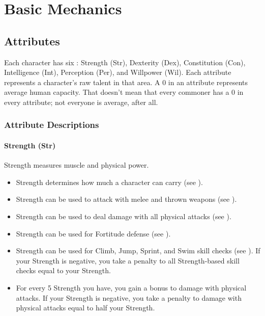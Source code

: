 \chapter{Basic Mechanics}

\section{Attributes}\label{Attributes}
    Each character has six : Strength (Str), Dexterity (Dex), Constitution (Con), Intelligence (Int), Perception (Per), and Willpower (Wil).
    Each attribute represents a character's raw talent in that area.
    A 0 in an attribute represents average human capacity.
    That doesn't mean that every commoner has a 0 in every attribute; not everyone is average, after all.

    \subsection{Attribute Descriptions}

        \subsubsection{Strength (Str)}\label{Strength}
            Strength measures muscle and physical power.
            \begin{itemize}
                \item Strength determines how much a character can carry (see ).
                \item Strength can be used to attack with melee and thrown weapons (see ).
                \item Strength can be used to deal damage with all physical attacks (see ).
                \item Strength can be used for Fortitude defense (see ).
                \item Strength can be used for Climb, Jump, Sprint, and Swim skill checks (see ). If your Strength is negative, you take a penalty to all Strength-based skill checks equal to your Strength.
                \item For every 5 Strength you have, you gain a  bonus to damage with physical attacks. If your Strength is negative, you take a penalty to damage with physical attacks equal to half your Strength.
            \end{itemize}

